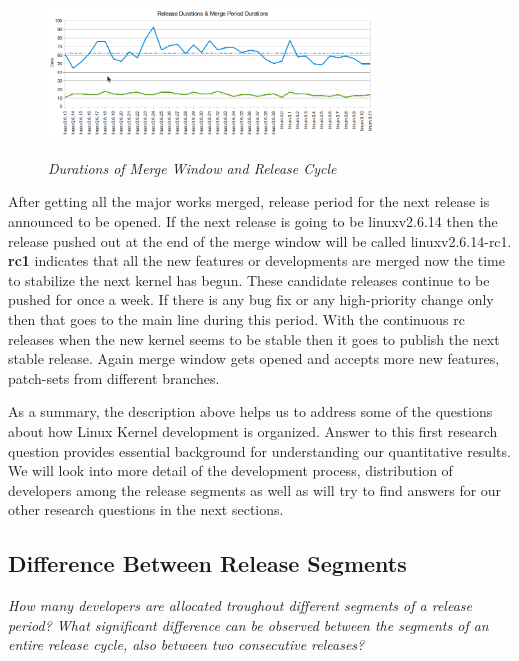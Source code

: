 \documentclass{acm_proc_article-sp}
\begin{document}
\begin{figure}
\begin{center}
\includegraphics[height=1.7in,width=3.4in]{linxrelmergfreq.png}
\caption{\small \sl Durations of Merge Window and Release Cycle}
\end{center}
\end{figure}

After getting all the major works merged, release period for the next release is announced to be opened. If the next release is going to be linuxv2.6.14 then the release pushed out at the end of the merge window will be called linuxv2.6.14-rc1. \textbf{rc1} indicates that all the new features or developments are merged now the time to stabilize the next kernel has begun. These candidate releases continue to be pushed for once a week. If there is any bug fix or any high-priority change only then that goes to the main line during this period. With the continuous rc releases when the new kernel seems to be stable then it goes to publish the next stable release. Again merge window gets opened and accepts more new features, patch-sets from different branches.

As a summary, the description above helps us to address some of the questions about how Linux Kernel development is organized. Answer to this first research question provides essential background for understanding our quantitative results. We will look into more detail of the development process, distribution of developers among the release segments as well as will try to find answers for our other research questions in the next sections.

\subsection{Difference Between Release Segments}
\textit{How many developers are allocated troughout different segments of a release period? What significant difference can be observed between the segments of an entire release cycle, also between two consecutive releases?}
\end{document}

